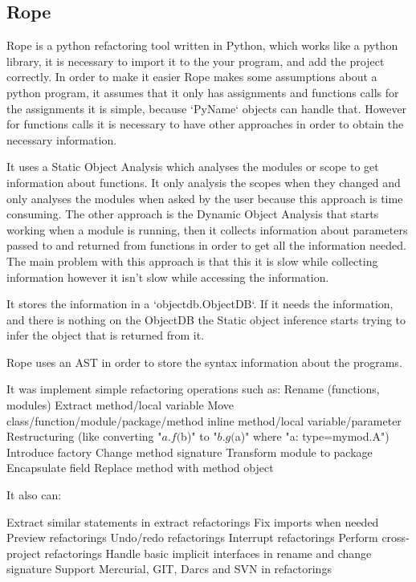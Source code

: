 
\subsection{Rope}

Rope is a python refactoring tool written in Python, which works like a python library, it is necessary to import it to the your program, and add the project correctly.
In order to make it easier Rope makes some assumptions about a python program, it assumes that it only has assignments and functions calls %
for the assignments it is simple, because `PyName` objects can handle that. However for functions calls it is necessary to have other approaches in order to obtain the necessary information. 

It uses a Static Object Analysis which analyses the modules or scope to get information about functions. It only analysis the scopes when they changed and only analyses the modules when asked by the user because this approach is time consuming. The other approach is the Dynamic Object Analysis that starts working when a module is running, then it collects information about parameters passed to and returned from functions in order to get all the information needed. The main problem with this approach is that this it is slow while collecting information however it isn't slow while accessing the information.

It stores the information in a `objectdb.ObjectDB`. If it needs the information, and there is nothing on the ObjectDB the Static object inference starts trying to infer the object that is returned from it.

Rope uses an AST in order to store the syntax information about the programs.

It was implement simple refactoring operations such as:
	Rename (functions, modules)
	Extract method/local variable
	Move class/function/module/package/method
	inline method/local variable/parameter
	Restructuring (like converting "${a}.f(${b})" to "${b}.g(${a})" where "a: type=mymod.A") 
	Introduce factory
	Change method signature
	Transform module to package
	Encapsulate field
	Replace method with method object

It also can:

    Extract similar statements in extract refactorings
    Fix imports when needed
    Preview refactorings
    Undo/redo refactorings
    Interrupt refactorings
    Perform cross-project refactorings
    Handle basic implicit interfaces in rename and change signature
    Support Mercurial, GIT, Darcs and SVN in refactorings




